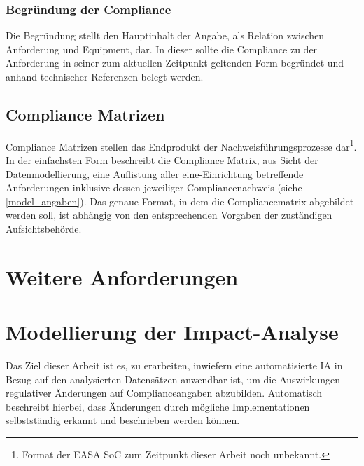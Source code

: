 \subsubsection{Begründung der Compliance}

Die Begründung stellt den Hauptinhalt der Angabe, als Relation zwischen Anforderung und Equipment, dar. 
In dieser sollte die Compliance zu der Anforderung in seiner zum aktuellen Zeitpunkt geltenden Form begründet und anhand technischer Referenzen belegt werden.




\subsection{Compliance Matrizen}

Compliance Matrizen stellen das Endprodukt der Nachweisführungsprozesse dar\footnote{Format der \ac{EASA} \ac{SoC} zum Zeitpunkt dieser Arbeit noch unbekannt.}.
In der einfachsten Form beschreibt die Compliance Matrix, aus Sicht der Datenmodellierung, eine Auflistung aller eine\atmans-Einrichtung betreffende Anforderungen inklusive dessen jeweiliger Compliancenachweis (siehe \ref{model_angaben}).
Das genaue Format, in dem die Compliancematrix abgebildet werden soll, ist abhängig von den entsprechenden Vorgaben der zuständigen Aufsichtsbehörde.



\section{Weitere Anforderungen}
\label{model_wa}



\pagebreak
\section{Modellierung der Impact-Analyse}
\label{model_ia}

Das Ziel dieser Arbeit ist es, zu erarbeiten, inwiefern eine automatisierte \acf{IA} in Bezug auf den analysierten Datensätzen anwendbar ist, um die Auswirkungen regulativer Änderungen auf Complianceangaben abzubilden.
Automatisch beschreibt hierbei, dass Änderungen durch mögliche Implementationen selbstständig erkannt und beschrieben werden können.

